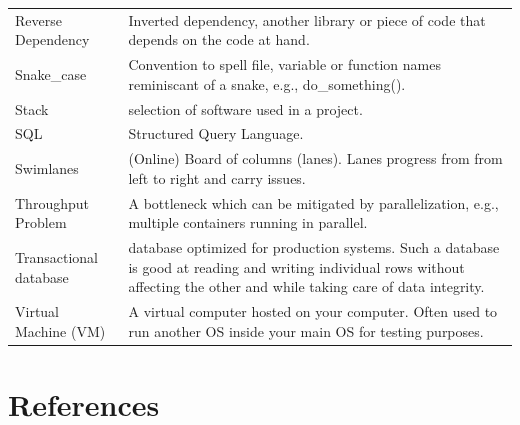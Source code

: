 \documentclass[
  12pt,
  letterpaper,
]{krantz}
\begin{document}
\begin{longtable}{l>{\raggedright\arraybackslash}p{6.8cm}}
Reverse Dependency & Inverted dependency, another library or piece of code that depends on the code at hand.\\
Snake\_case & Convention to spell file, variable or function names reminiscant of a snake, e.g., do\_something().\\
\addlinespace
Stack & selection of software used in a project.\\
SQL & Structured Query Language.\\
Swimlanes & (Online) Board of columns (lanes). Lanes progress from from left to right and carry issues.\\
Throughput Problem & A bottleneck which can be mitigated by parallelization, e.g., multiple containers running in parallel.\\
Transactional database & database optimized for production systems. Such a database is good at reading and writing individual rows without affecting the other and while taking care of data integrity.\\
\addlinespace
Virtual Machine (VM) & A virtual computer hosted on your computer. Often used to run another OS inside your main OS for testing purposes.\\*
\end{longtable}


\hypertarget{references}{%
\chapter*{References}\label{references}}

\end{document}
